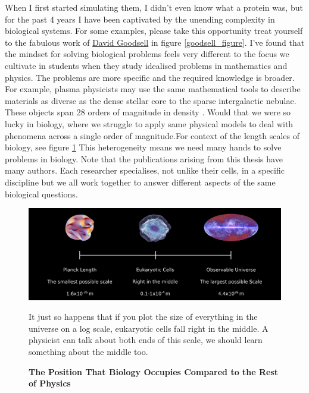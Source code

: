 When I first started simulating them, I didn't even know what a protein was, but for the past 4 years I have been captivated by the unending complexity in biological systems. For some examples, please take this opportunity treat yourself to the fabulous work of \href {https://pdb101.rcsb.org/sci-art/goodsell-gallery}{David Goodsell} in figure \ref{goodsell_figure}. I've found that the mindset for solving biological problems feels very different to the focus we cultivate in students when they study idealised problems in mathematics and physics. The problems are more specific and the required knowledge is broader. For example, plasma physicists may use the same mathematical tools to describe materials as diverse as the dense stellar core to the sparse intergalactic nebulae. These objects span 28 orders of magnitude in density \cite{chen2018}. Would that we were so lucky in biology, where we struggle to apply same physical models to deal with phenomena across a single order of magnitude.For context of the length scales of biology, see figure \ref{length_scales} This heterogeneity means we need many hands to solve problems in biology. Note that the publications arising from this thesis have many authors. Each researcher specialises, not unlike their cells, in a specific discipline but we all work together to answer different aspects of the same biological questions.

\begin{figure}
	\begin{center}
		\includegraphics[width=1.0\textwidth]{figures/scales.png}
	\end{center}
	\captionsetup{singlelinecheck = false, justification=raggedright}
	\caption[The Position That Biology Occupies Compared to the Rest of Physics] {\textbf{The Position That Biology Occupies Compared to the Rest of Physics}}{It just so happens that if you plot the size of everything  in the universe on a log scale, eukaryotic cells fall right in the middle. A physicist can talk about both ends of this scale, we should learn something about the middle too.}
	\label{length_scales}
\end{figure}

